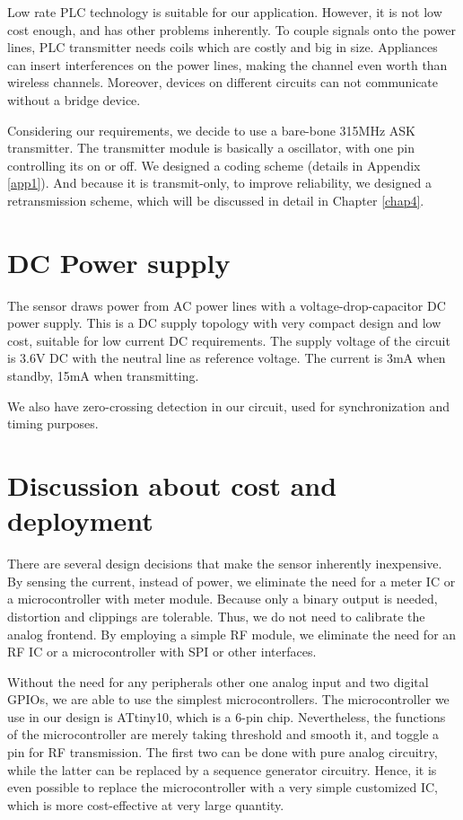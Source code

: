 Low rate PLC technology is suitable for our application. However, it is not low cost enough, and has other problems inherently. To couple signals onto the power lines, PLC transmitter needs coils which are costly and big in size. Appliances can insert interferences on the power lines, making the channel even worth than wireless channels. Moreover, devices on different circuits can not communicate without a bridge device. 

Considering our requirements, we decide to use a bare-bone 315MHz ASK transmitter. The transmitter module is basically a oscillator, with one pin controlling its on or off. We designed a coding scheme (details in Appendix \ref{app1}). And because it is transmit-only, to improve reliability, we designed a retransmission scheme, which will be discussed in detail in Chapter \ref{chap4}. 

\section{DC Power supply}

The sensor draws power from AC power lines with a voltage-drop-capacitor DC power supply. This is a DC supply topology with very compact design and low cost, suitable for low current DC requirements. The supply voltage of the circuit is 3.6V DC with the neutral line as reference voltage. The current is 3mA when standby, 15mA when transmitting. 

We also have zero-crossing detection in our circuit, used for synchronization and timing purposes. 

\section{Discussion about cost and deployment}

There are several design decisions that make the sensor inherently inexpensive. By sensing the current, instead of power, we eliminate the need for a meter IC or a microcontroller with meter module. Because only a binary output is needed, distortion and clippings are tolerable. Thus, we do not need to calibrate the analog frontend. By employing a simple RF module, we eliminate the need for an RF IC or a microcontroller with SPI or other interfaces. 

Without the need for any peripherals other one analog input and two digital GPIOs, we are able to use the simplest microcontrollers. The microcontroller we use in our design is ATtiny10, which is a 6-pin chip. Nevertheless, the functions of the microcontroller are merely taking threshold and smooth it, and toggle a pin for RF transmission. The first two can be done with pure analog circuitry, while the latter can be replaced by a sequence generator circuitry. Hence, it is even possible to replace the microcontroller with a very simple customized IC, which is more cost-effective at very large quantity. 

